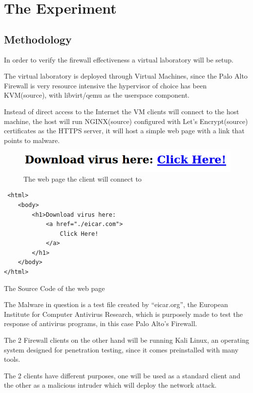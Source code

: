 \chapter{The Experiment}
\section{Methodology}

In order to verify the firewall effectiveness a virtual laboratory will be setup.

The virtual laboratory is deployed through Virtual Machines, since the Palo Alto Firewall is very resource intensive the hypervisor of choice has been KVM(source), with libvirt/qemu as the userspace component.

Instead of direct access to the Internet the VM clients will connect to the host machine, the host will run NGINX(source) configured with Let's Encrypt(source) certificates as the HTTPS server, it will host a simple web page with a link that points to malware.

\begin{figure}[h!]
 \centering
 \includegraphics[width=13cm]{img/webpage.png}
 \caption{The web page the client will connect to}
 \label{fig: webpage}
\end{figure}

\begin{verbatim}
 <html>
    <body>
        <h1>Download virus here:
            <a href="./eicar.com">
                Click Here!
            </a>
        </h1>
    </body>
</html>
\end{verbatim}

\begin{center}
The Source Code of the web page
\end{center}


The Malware in question is a test file created by ``eicar.org'', the European Institute for Computer Antivirus Research, which is purposely made to test the response of antivirus programs\cite{eicar}, in this case Palo Alto's Firewall.

The 2 Firewall clients on the other hand will be running  Kali Linux, an operating system designed for penetration testing, since it comes preinstalled with many tools.

The 2 clients have different purposes, one will be used as a standard client and the other as a malicious intruder which will deploy the network attack.

